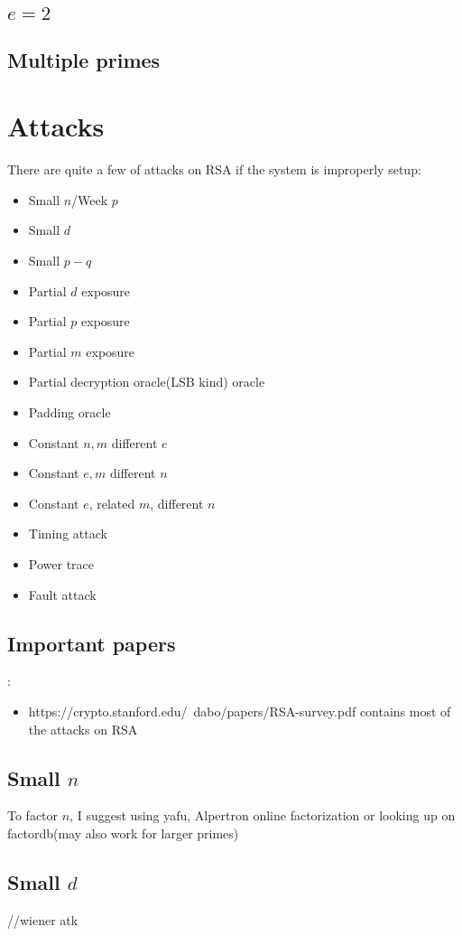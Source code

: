\documentclass{report}
\begin{document}
\subsection{$e=2$}
\subsection{Multiple primes}
\section{Attacks}
There are quite a few of attacks on RSA if the system is improperly setup:
\begin{itemize}
	\item Small $n$/Week $p$
	\item Small $d$
	\item Small $p-q$
	\item Partial $d$ exposure
	\item Partial $p$ exposure
	\item Partial $m$ exposure
	\item Partial decryption oracle(LSB kind) oracle
	\item Padding oracle
	\item Constant $n,m$ different $e$
	\item Constant $e,m$ different $n$
	\item Constant $e$, related $m$, different $n$
	\item Timing attack
	\item Power trace
	\item Fault attack
\end{itemize}

\subsection{Important papers}:

\begin{itemize}
	\item https://crypto.stanford.edu/~dabo/papers/RSA-survey.pdf contains most of the attacks on RSA
\end{itemize}

\subsection{Small $n$}
To factor $n$, I suggest using yafu, Alpertron online factorization or looking up on factordb(may also work for larger primes)
\subsection{Small $d$}
//wiener atk
\end{document}
